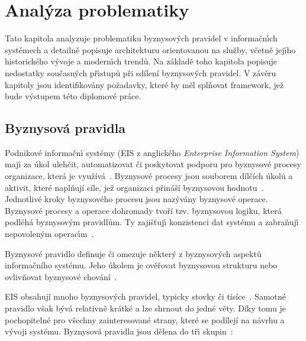 
\chapter{Anal\'yza problematiky}\label{ch:analyza}

Tato kapitola analyzuje problematiku byznysov\'ych pravidel v informačn\'{\i}ch systémech
a detailně popisuje architekturu orientovanou na služby, včetně jej\'{\i}ho historického
v\'yvoje a modern\'{\i}ch trendů. Na základě toho kapitola popisuje nedostatky
současn\'ych př\'{\i}stupů při sdílení byznysových pravidel. V závěru kapitoly jsou
identifikovány požadavky, které by měl splňovat framework, jež bude v\'ystupem této diplomové práce.

\section{Byznysová pravidla}\label{sec:business-rules}

Podnikové informačn\'{\i} systémy (\gls{EIS} z anglického \textit{Enterprise Information System})
maj\'{\i} za úkol ulehčit, automatizovat či poskytovat podporu pro byznysové procesy organizace,
která je využívá~\cite{dumas2005process}. Byznysové procesy jsou souborem dílčích úkolů
a aktivit, které naplňují cíle, jež organizaci přináší byznysovou hodnotu~\cite{weske2012business}.
Jednotlivé kroky byznysového procesu jsou nazývány byznysové operace. Byznysové procesy a operace dohromady
tvoří tzv. byznysovou logiku, která podléhá byznysov\'ym pravidlům. Ty zajišťuj\'{\i} konzistenci dat
systému a zabraňuj\'{\i} nepovolen\'ym operac\'{\i}m~\cite{cemus2015automated}.

\begin{definition}
    Byznysové pravidlo definuje či omezuje některý z byznysových aspektů informačního systému.
    Jeho úkolem je ověřovat byznysovou strukturu nebo ovlivňovat byznysové chování~\cite{morgan2002business}.
\end{definition}

\gls{EIS} obsahují mnoho byznysových pravidel, typicky stovky či tisíce~\cite{morgan2002business}.
Samotné pravidlo však bývá relativně krátké a lze shrnout do jedné věty. Díky tomu je pochopitelné
pro všechny zainteresované strany, které se podílejí na návrhu a vývoji systému.
Byznysová pravidla jsou dělena do tř\'{\i} skupin~\cite{cemus2014aspect}:

